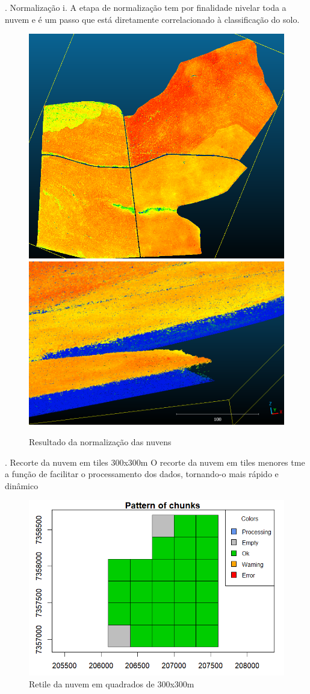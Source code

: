 \documentclass[
]{article}
\begin{document}
. Normalização i. A etapa de normalização tem por finalidade nivelar
toda a nuvem e é um passo que está diretamente correlacionado à
classificação do solo.

\begin{figure}

{\centering \includegraphics[width=0.4\linewidth]{IMAGES/nuvensnormalizadas} \includegraphics[width=0.4\linewidth]{IMAGES/nivelamento} 

}

\caption{Resultado da normalização das nuvens}\label{fig:unnamed-chunk-13}
\end{figure}

. Recorte da nuvem em tiles 300x300m O recorte da nuvem em tiles menores
tme a função de facilitar o processamento dos dados, tornando-o mais
rápido e dinâmico

\begin{figure}

{\centering \includegraphics[width=0.5\linewidth]{IMAGES/Retile} 

}

\caption{Retile da nuvem em quadrados de 300x300m}\label{fig:unnamed-chunk-14}
\end{figure}
\newpage
\end{document}
